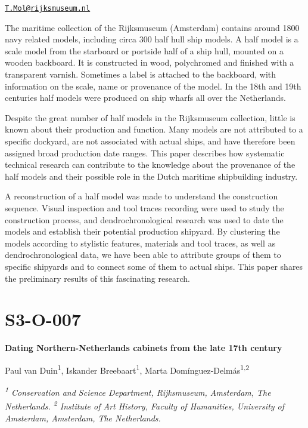 \documentclass[
]{book}
\begin{document}
\href{mailto:T.Mol@rijksmuseum.nl}{\nolinkurl{T.Mol@rijksmuseum.nl}}

The maritime collection of the Rijksmuseum (Amsterdam) contains around 1800 navy related models, including circa 300 half hull ship models. A half model is a scale model from the starboard or portside half of a ship hull, mounted on a wooden backboard. It is constructed in wood, polychromed and finished with a transparent varnish. Sometimes a label is attached to the backboard, with information on the scale, name or provenance of the model. In the 18th and 19th centuries half models were produced on ship wharfs all over the Netherlands.

Despite the great number of half models in the Rijksmuseum collection, little is known about their production and function. Many models are not attributed to a specific dockyard, are not associated with actual ships, and have therefore been assigned broad production date ranges. This paper describes how systematic technical research can contribute to the knowledge about the provenance of the half models and their possible role in the Dutch maritime shipbuilding industry.

A reconstruction of a half model was made to understand the construction sequence. Visual inspection and tool traces recording were used to study the construction process, and dendrochronological research was used to date the models and establish their potential production shipyard. By clustering the models according to stylistic features, materials and tool traces, as well as dendrochronological data, we have been able to attribute groups of them to specific shipyards and to connect some of them to actual ships. This paper shares the preliminary results of this fascinating research.

\hypertarget{s3-o-007}{%
\section*{S3-O-007}\label{s3-o-007}}

\textbf{Dating Northern-Netherlands cabinets from the late 17th century}

Paul van Duin\textsuperscript{1}, Iskander Breebaart\textsuperscript{1}, Marta Domínguez-Delmás\textsuperscript{1,2}

\emph{\textsuperscript{1} Conservation and Science Department, Rijksmuseum, Amsterdam, The Netherlands. \textsuperscript{2} Institute of Art History, Faculty of Humanities, University of Amsterdam, Amsterdam, The Netherlands.}
\end{document}
